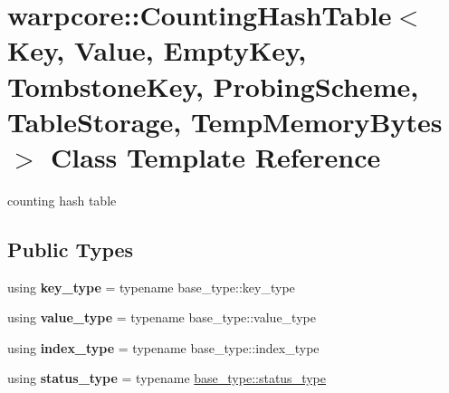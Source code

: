 \hypertarget{classwarpcore_1_1CountingHashTable}{}\section{warpcore\+:\+:Counting\+Hash\+Table$<$ Key, Value, Empty\+Key, Tombstone\+Key, Probing\+Scheme, Table\+Storage, Temp\+Memory\+Bytes $>$ Class Template Reference}
\label{classwarpcore_1_1CountingHashTable}


counting hash table  


\subsection*{Public Types}
\begin{DoxyCompactItemize}
\item 
\mbox{\label{classwarpcore_1_1CountingHashTable_aa0a20d833b8366c642acc976c811a415}} 
using {\bfseries key\+\_\+type} = typename base\+\_\+type\+::key\+\_\+type
\item 
\mbox{\label{classwarpcore_1_1CountingHashTable_a54cb72d239d8f22878b3e9b8f3747f18}} 
using {\bfseries value\+\_\+type} = typename base\+\_\+type\+::value\+\_\+type
\item 
\mbox{\label{classwarpcore_1_1CountingHashTable_ab52c5d70cbaaf14be48225373435b2b4}} 
using {\bfseries index\+\_\+type} = typename base\+\_\+type\+::index\+\_\+type
\item 
\mbox{\label{classwarpcore_1_1CountingHashTable_a0c86dbcd344a2b465275507f2910ce4e}} 
using {\bfseries status\+\_\+type} = typename \hyperlink{classwarpcore_1_1Status}{base\+\_\+type\+::status\+\_\+type}
\end{DoxyCompactItemize}
